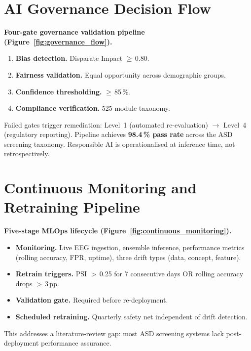 \section{AI Governance Decision Flow}
\label{sec:appendix_ch5_governance_flow}

\noindent\textbf{Four-gate governance validation pipeline (Figure~\ref{fig:governance_flow}).}
\begin{enumerate}[leftmargin=*, itemsep=2pt]
    \item \textbf{Bias detection.} Disparate Impact $\geq$\,0.80.
    \item \textbf{Fairness validation.} Equal opportunity across demographic groups.
    \item \textbf{Confidence thresholding.} $\geq$\,85\,\%.
    \item \textbf{Compliance verification.} 525-module taxonomy.
\end{enumerate}
\noindent Failed gates trigger remediation: Level~1 (automated re-evaluation) $\to$ Level~4 (regulatory reporting). Pipeline achieves \textbf{98.4\,\% pass rate} across the ASD screening taxonomy. Responsible AI is operationalised at inference time, not retrospectively.



\section{Continuous Monitoring and Retraining Pipeline}
\label{sec:appendix_ch5_monitoring}

\noindent\textbf{Five-stage MLOps lifecycle (Figure~\ref{fig:continuous_monitoring}).}
\begin{itemize}[leftmargin=*, itemsep=2pt]
    \item \textbf{Monitoring.} Live EEG ingestion, ensemble inference, performance metrics (rolling accuracy, FPR, uptime), three drift types (data, concept, feature).
    \item \textbf{Retrain triggers.} PSI $>$\,0.25 for 7 consecutive days OR rolling accuracy drops $>$\,3\,pp.
    \item \textbf{Validation gate.} Required before re-deployment.
    \item \textbf{Scheduled retraining.} Quarterly safety net independent of drift detection.
\end{itemize}
\noindent This addresses a literature-review gap: most ASD screening systems lack post-deployment performance assurance.

